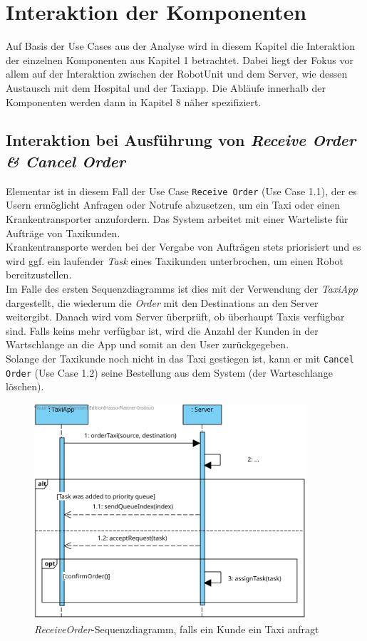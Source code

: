 \section{Interaktion der Komponenten}
Auf Basis der Use Cases aus der Analyse wird in diesem Kapitel die Interaktion der einzelnen Komponenten aus Kapitel 1 betrachtet. 
Dabei liegt der Fokus vor allem auf der Interaktion zwischen der RobotUnit und dem Server, wie dessen Austausch mit dem Hospital und der Taxiapp. 
Die Abläufe innerhalb der Komponenten werden dann in Kapitel 8 näher spezifiziert. \\


\subsection*{Interaktion bei Ausführung von \emph{Receive Order \& Cancel Order}}

Elementar ist in diesem Fall der Use Case \texttt{Receive Order} (Use Case 1.1), der es Usern ermöglicht Anfragen oder Notrufe abzusetzen, um ein Taxi oder einen Krankentransporter anzufordern. 
Das System arbeitet mit einer Warteliste für Aufträge von Taxikunden. \\
Krankentransporte werden bei der Vergabe von Aufträgen stets priorisiert und es wird ggf. ein laufender \emph{Task} eines Taxikunden unterbrochen, um einen Robot bereitzustellen. \\
Im Falle des ersten Sequenzdiagramms ist dies mit der Verwendung der \emph{TaxiApp} dargestellt, die wiederum die \emph{Order} mit den Destinations an den Server weitergibt.
Danach wird vom Server überprüft, ob überhaupt Taxis verfügbar sind.
Falls keins mehr verfügbar ist, wird die Anzahl der Kunden in der Wartschlange an die App und somit an den User zurückgegeben. \\
Solange der Taxikunde noch nicht in das Taxi gestiegen ist, kann er mit \texttt{Cancel Order} (Use Case 1.2) seine Bestellung aus dem System (der Warteschlange löschen). \\

\begin{figure}[H]
	\centering
	\includegraphics[width=0.9\textwidth]{img/2-Entwurf-ReceiveOrder-Taxi}
	\caption{\emph{ReceiveOrder}-Sequenzdiagramm, falls ein Kunde ein Taxi anfragt}
	\label{SequenzDiagrammInteraktion}
\end{figure}

